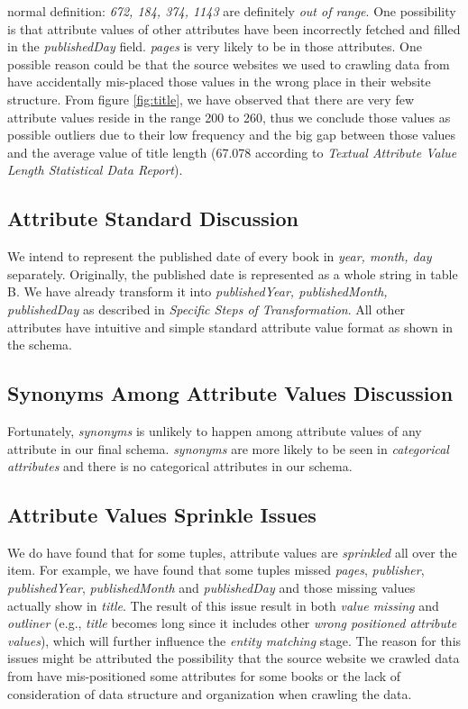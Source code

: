 \documentclass[10pt, oneside]{article}
\begin{document}
normal definition: \textit{672, 184, 374, 1143} are definitely \textit{out of range}. One possibility is that attribute values of other attributes have been incorrectly 
fetched and filled in the \textit{publishedDay} field. \textit{pages} is very likely to be in those attributes. One possible reason could be that the source websites
we used to crawling data from have accidentally mis-placed those values in the wrong place in their website structure. From figure \ref{fig:title}, we have observed 
that there are very few attribute values reside in the range 200 to 260, thus we conclude those values as possible outliers due to their low frequency and the big 
gap between those values and the average value of title length (67.078 according to \textit{Textual Attribute Value Length Statistical Data Report}).

\subsection*{Attribute Standard Discussion}
We intend to represent the published date of every book in \textit{year, month, day} separately. Originally, the published date is represented as a whole string in 
table B. We have already transform it into \textit{publishedYear, publishedMonth, publishedDay} as described in \textit{Specific Steps of Transformation}. All other 
attributes have intuitive and simple standard attribute value format as shown in the schema.
\subsection*{Synonyms Among Attribute Values Discussion}
Fortunately, \textit{synonyms} is unlikely to happen among attribute values of any attribute in our final schema. \textit{synonyms} are more likely to be seen in 
\textit{categorical attributes} and there is no categorical attributes in our schema.

\subsection*{Attribute Values Sprinkle Issues}
We do have found that for some tuples, attribute values are \textit{sprinkled} all over the item. For example, we have found that some tuples missed \textit{pages},
\textit{publisher}, \textit{publishedYear}, \textit{publishedMonth} and \textit{publishedDay} and those missing values actually show in \textit{title}. The result of this issue
result in both \textit{value missing} and \textit{outliner} (e.g., \textit{title} becomes long since it includes other \textit{wrong positioned attribute values}), which will 
further influence the \textit{entity matching} stage. The reason for this issues might be attributed the possibility that the source website we crawled data from have 
mis-positioned some attributes for some books or the lack of consideration of data structure and organization when crawling the data.
\end{document}
